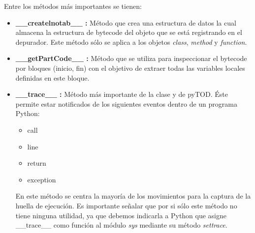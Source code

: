 \documentclass[12pt,legalpaper]{report}
\begin{document}
Entre los métodos más importantes se tienen:
\begin{itemize}
	\item \textbf{\_\_createlnotab\_\_ :} Método que crea una estructura de datos la cual almacena la estructura de bytecode del objeto que se está registrando en el depurador.  Este método sólo se aplica a los objetos \textit{class}, \textit{method} y \textit{function}.

	\item \textbf{\_\_getPartCode\_\_ :} Método que se utiliza para inspeccionar el bytecode por bloques (inicio, fin) con el objetivo de extraer todas las variables locales definidas en este bloque.
	
	\item \textbf{\_\_trace\_\_ :} Método más importante de la clase y de pyTOD.  Éste permite estar notificados de los siguientes eventos dentro de un programa Python:
	\begin{itemize}
		\item call
		\item line
		\item return
		\item exception
	\end{itemize}
En este método se centra la mayoría de los movimientos para la captura de la huella de ejecución.  Es importante señalar que por si sólo este método no tiene ninguna utilidad, ya que debemos indicarla a Python que asigne \_\_trace\_\_ como función al módulo \textit{sys} mediante su método \textit{settrace}.
\end{itemize}
\end{document}
